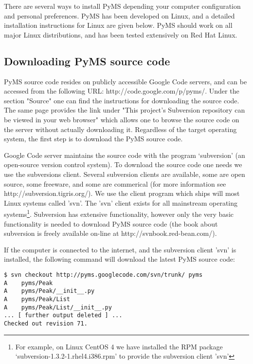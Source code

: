 There are several ways to install PyMS depending your computer
configuration and personal preferences. PyMS has been developed
on Linux, and a detailed installation instructions for Linux are
given below. PyMS should work on all major Linux distributions,
and has been tested extensively on Red Hat Linux.

\subsection{\label{subsec:code-download}Downloading PyMS source code}

PyMS source code resides on publicly accessible Google Code servers,
and can be accessed from the following URL: http://code.google.com/p/pyms/.
Under the section "Source" one can find the instructions for downloading
the source code. The same page provides the link under "This project's
Subversion repository can be viewed in your web browser" which allows
one to browse the source code on the server without actually downloading
it. Regardless of the target operating system, the first step is to
download the PyMS source code.

Google Code server maintains the source code with the program `subversion'
(an open-source version control system). To download the source code
one needs we use the subversions client. Several subversion clients are
available, some are open source, some freeware, and some are commerical
(for more information see http://subversion.tigris.org/).
We use the client program which ships will most Linux systems called
'svn'. The 'svn' client exists for all mainstream operating
systems\footnote{For example, on Linux CentOS 4 we have installed the
RPM package `subversion-1.3.2-1.rhel4.i386.rpm' to provide the subversion
client 'svn'}. Subversion has extensive functionality, however only the
very basic functionality is needed to download PyMS source code (the
book about subversion is freely available on-line at
http://svnbook.red-bean.com/).

If the computer is connected to the internet, and the subversion client
'svn' is installed, the following command will download the latest PyMS
source code:

\begin{verbatim}
$ svn checkout http://pyms.googlecode.com/svn/trunk/ pyms
A    pyms/Peak
A    pyms/Peak/__init__.py
A    pyms/Peak/List
A    pyms/Peak/List/__init__.py
... [ further output deleted ] ...
Checked out revision 71.
\end{verbatim}

